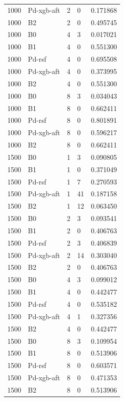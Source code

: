 \documentclass[10pt,a4paper]{article}
\begin{document}
{\begin{longtable}{@{\extracolsep{\fill}}lllll}
1000 & Pd-xgb-aft & 2 & 0 & 0.171868\\
1000 & B2 & 2 & 0 & 0.495745\\
1000 & B0 & 4 & 3 & 0.017021\\
1000 & B1 & 4 & 0 & 0.551300\\
1000 & Pd-rsf & 4 & 0 & 0.695508\\
1000 & Pd-xgb-aft & 4 & 0 & 0.373995\\
1000 & B2 & 4 & 0 & 0.551300\\
1000 & B0 & 8 & 3 & 0.034043\\
1000 & B1 & 8 & 0 & 0.662411\\
1000 & Pd-rsf & 8 & 0 & 0.801891\\
1000 & Pd-xgb-aft & 8 & 0 & 0.596217\\
1000 & B2 & 8 & 0 & 0.662411\\
1500 & B0 & 1 & 3 & 0.090805\\
1500 & B1 & 1 & 0 & 0.371049\\
1500 & Pd-rsf & 1 & 7 & 0.270593\\
1500 & Pd-xgb-aft & 1 & 41 & 0.187158\\
1500 & B2 & 1 & 12 & 0.063450\\
1500 & B0 & 2 & 3 & 0.093541\\
1500 & B1 & 2 & 0 & 0.406763\\
1500 & Pd-rsf & 2 & 3 & 0.406839\\
1500 & Pd-xgb-aft & 2 & 14 & 0.303040\\
1500 & B2 & 2 & 0 & 0.406763\\
1500 & B0 & 4 & 3 & 0.099012\\
1500 & B1 & 4 & 0 & 0.442477\\
1500 & Pd-rsf & 4 & 0 & 0.535182\\
1500 & Pd-xgb-aft & 4 & 1 & 0.327356\\
1500 & B2 & 4 & 0 & 0.442477\\
1500 & B0 & 8 & 3 & 0.109954\\
1500 & B1 & 8 & 0 & 0.513906\\
1500 & Pd-rsf & 8 & 0 & 0.603571\\
1500 & Pd-xgb-aft & 8 & 0 & 0.471353\\
1500 & B2 & 8 & 0 & 0.513906\\
\end{longtable}}
\end{document}
